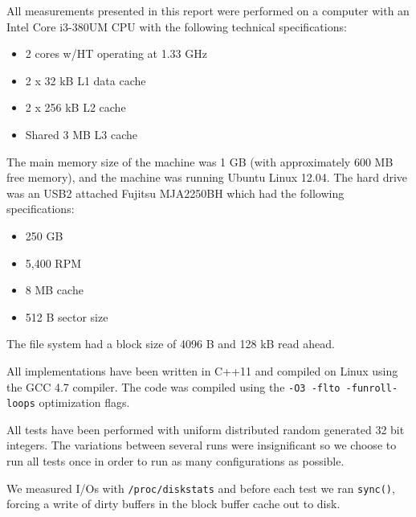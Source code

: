 All measurements presented in this report were performed on a computer
with an Intel Core i3-380UM CPU with the following technical
specifications:
\begin{itemize}
\item 2 cores w/HT operating at 1.33 GHz
\item 2 x 32 kB L1 data cache
\item 2 x 256 kB L2 cache
\item Shared 3 MB L3 cache
\end{itemize}
The main memory size of the machine was 1 GB (with approximately 600 MB free memory), and the machine was running Ubuntu
Linux 12.04. The hard drive was an USB2 attached Fujitsu MJA2250BH which had the following specifications:

\begin{itemize}
\item 250 GB
\item 5,400 RPM
\item 8 MB cache
\item 512 B sector size
\end{itemize}

The file system had a block size of 4096 B and 128 kB read ahead.

All implementations have been
written in C++11 and compiled on Linux using the GCC 4.7 compiler. The
code was compiled using the \texttt{-O3 -flto -funroll-loops}
optimization flags.

All tests have been performed with uniform distributed random generated 32 bit integers. The variations between several runs were insignificant so we choose to run all tests once in order to run as many configurations as possible.

We measured I/Os with \texttt{/proc/diskstats} and before each test we ran \texttt{sync()}, forcing a write of dirty buffers in the block buffer cache out to disk.